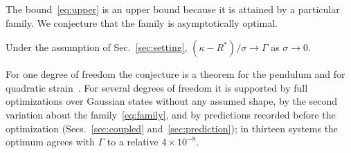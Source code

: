 The bound~\eqref{eq:upper} is an upper bound because it is attained by a particular family. We conjecture that the family is asymptotically optimal.

\begin{conjecture}
\label{conj:optimal}
Under the assumption of Sec.~\ref{sec:setting}, $(\kappa - R^*)/\sigma \to \Gamma$ as $\sigma \to 0$.
\end{conjecture}

For one degree of freedom the conjecture is a theorem for the pendulum and for quadratic strain~\cite{namba2026gap}. For several degrees of freedom it is supported by full optimizations over Gaussian states without any assumed shape, by the second variation about the family~\eqref{eq:family}, and by predictions recorded before the optimization (Secs.~\ref{sec:coupled} and~\ref{sec:prediction}); in thirteen systems the optimum agrees with $\Gamma$ to a relative $4\times10^{-8}$.
